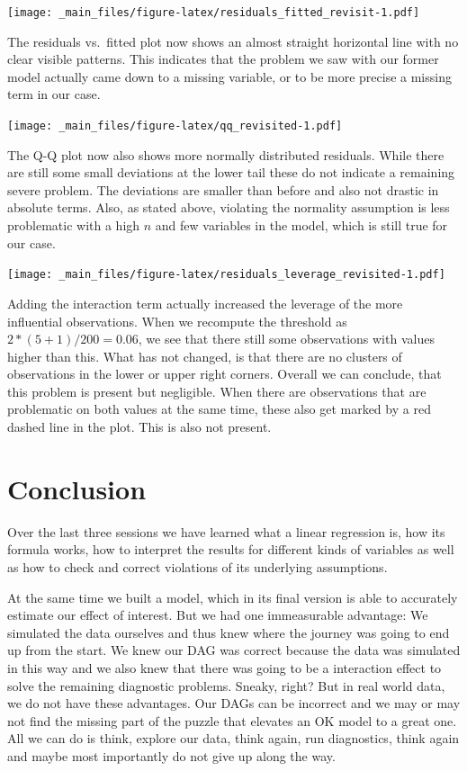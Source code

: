 \documentclass[
]{book}
\begin{document}
\texttt{[image: \_main\_files/figure-latex/residuals\_fitted\_revisit-1.pdf]}

The residuals vs.~fitted plot now shows an almost straight horizontal line with no clear visible patterns. This indicates that the problem we saw with our former model actually came down to a missing variable, or to be more precise a missing term in our case.

\texttt{[image: \_main\_files/figure-latex/qq\_revisited-1.pdf]}

The Q-Q plot now also shows more normally distributed residuals. While there are still some small deviations at the lower tail these do not indicate a remaining severe problem. The deviations are smaller than before and also not drastic in absolute terms. Also, as stated above, violating the normality assumption is less problematic with a high \(n\) and few variables in the model, which is still true for our case.

\texttt{[image: \_main\_files/figure-latex/residuals\_leverage\_revisited-1.pdf]}

Adding the interaction term actually increased the leverage of the more influential observations. When we recompute the threshold as \(2 * (5 + 1) / 200 = 0.06\), we see that there still some observations with values higher than this. What has not changed, is that there are no clusters of observations in the lower or upper right corners. Overall we can conclude, that this problem is present but negligible. When there are observations that are problematic on both values at the same time, these also get marked by a red dashed line in the plot. This is also not present.

\hypertarget{conclusion}{%
\section{Conclusion}\label{conclusion}}

Over the last three sessions we have learned what a linear regression is, how its formula works, how to interpret the results for different kinds of variables as well as how to check and correct violations of its underlying assumptions.

At the same time we built a model, which in its final version is able to accurately estimate our effect of interest. But we had one immeasurable advantage: We simulated the data ourselves and thus knew where the journey was going to end up from the start. We knew our DAG was correct because the data was simulated in this way and we also knew that there was going to be a interaction effect to solve the remaining diagnostic problems. Sneaky, right? But in real world data, we do not have these advantages. Our DAGs can be incorrect and we may or may not find the missing part of the puzzle that elevates an OK model to a great one. All we can do is think, explore our data, think again, run diagnostics, think again and maybe most importantly do not give up along the way.
\end{document}

